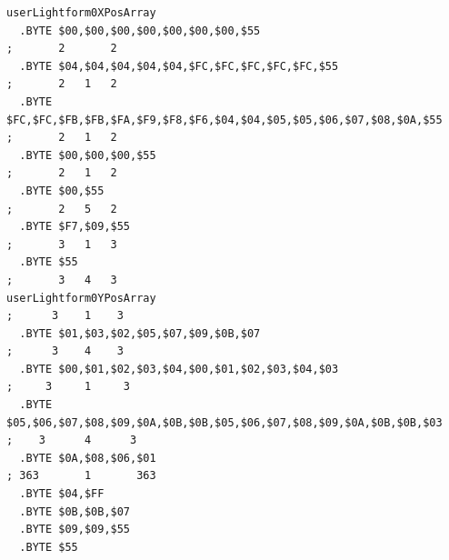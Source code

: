 \begin{lstlisting}[basicstyle=\ttfamily\tiny]
userLightform0XPosArray
  .BYTE $00,$00,$00,$00,$00,$00,$00,$55                                        ;       2       2      
  .BYTE $04,$04,$04,$04,$04,$FC,$FC,$FC,$FC,$FC,$55                            ;       2   1   2      
  .BYTE $FC,$FC,$FB,$FB,$FA,$F9,$F8,$F6,$04,$04,$05,$05,$06,$07,$08,$0A,$55    ;       2   1   2      
  .BYTE $00,$00,$00,$55                                                        ;       2   1   2      
  .BYTE $00,$55                                                                ;       2   5   2      
  .BYTE $F7,$09,$55                                                            ;       3   1   3      
  .BYTE $55                                                                    ;       3   4   3      
userLightform0YPosArray                                                        ;      3    1    3     
  .BYTE $01,$03,$02,$05,$07,$09,$0B,$07                                        ;      3    4    3     
  .BYTE $00,$01,$02,$03,$04,$00,$01,$02,$03,$04,$03                            ;     3     1     3    
  .BYTE $05,$06,$07,$08,$09,$0A,$0B,$0B,$05,$06,$07,$08,$09,$0A,$0B,$0B,$03    ;    3      4      3   
  .BYTE $0A,$08,$06,$01                                                        ; 363       1       363
  .BYTE $04,$FF
  .BYTE $0B,$0B,$07
  .BYTE $09,$09,$55                                                         
  .BYTE $55
\end{lstlisting}


